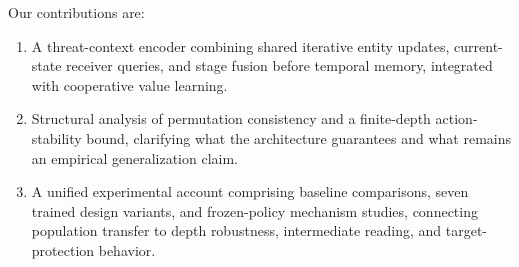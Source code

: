 Our contributions are:
\begin{enumerate}
\item A threat-context encoder combining shared iterative entity updates, current-state receiver queries, and stage fusion before temporal memory, integrated with cooperative value learning.
\item Structural analysis of permutation consistency and a finite-depth action-stability bound, clarifying what the architecture guarantees and what remains an empirical generalization claim.
\item A unified experimental account comprising baseline comparisons, seven trained design variants, and frozen-policy mechanism studies, connecting population transfer to depth robustness, intermediate reading, and target-protection behavior.
\end{enumerate}
